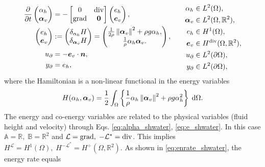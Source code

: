 \begin{equation}
\begin{aligned}
\diffp{}{t}
\begin{pmatrix}
\alpha_h \\
\bm{\alpha}_v \\
\end{pmatrix} &= -
\begin{bmatrix}
0 & \div \\
\grad & \bm{0}
\end{bmatrix}
\begin{pmatrix}
e_h \\
\bm{e}_v \\
\end{pmatrix}, \\
\begin{pmatrix}
e_h  \\
\bm{e}_v
\end{pmatrix}
&:=
\begin{pmatrix}
\delta_{\alpha_h} H\\
\delta_{\bm{\alpha}_v} H
\end{pmatrix} = 
\begin{pmatrix}
\frac{1}{2 \rho} \norm{\bm{\alpha}_v}^2 + \rho g \alpha_h, \\
\frac{1}{\rho} \alpha_h \bm{\alpha}_v.
\end{pmatrix}, \\
{u}_\partial &= - \bm{e}_v \cdot\bm{n}, \\
{y}_\partial &= {e}_h, \\
\end{aligned} \qquad 
\begin{aligned}
\alpha_h &\in L^2(\Omega), \\
\bm{\alpha}_v &\in L^2(\Omega, \mathbb{R}^2), \\
e_h &\in H^1(\Omega), \\
\bm{e}_v &\in H^{\div}(\Omega, \mathbb{R}^2), \\
u_\partial &\in L^2(\partial\Omega), \\
y_\partial &\in L^2(\partial\Omega),
\end{aligned}
\end{equation} 
where the Hamiltonian is a non-linear functional in the energy variables 
\begin{equation*}
H(\alpha_h, \bm{\alpha}_v) = \energy{\frac{1}{\rho} \alpha_h \norm{\bm{\alpha}_v}^2 + \rho g \alpha_h^2}.
\end{equation*}
The energy and co-energy variables are related to the physical variables (fluid height and velocity) through Eqs. \eqref{eq:alpha_shwater}, \eqref{eq:e_shwater}. In this case $\mathbb{A} = \mathbb{R},\; \mathbb{B} = \mathbb{R}^2$ and $\mathcal{L} = \operatorname*{grad}, \; -\mathcal{L}^* = \operatorname{div}$. This implies $H^{\mathcal{L}} = H^1(\Omega), \; H^{-\mathcal{L}^*} = H^{\div}(\Omega, \mathbb{R}^2)$. As shown in \eqref{eq:enrate_shwater}, the energy rate equals
